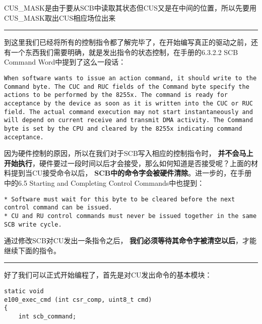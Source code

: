 \documentclass{article}
\newcommand{\highlight}[1]{{\bfseries \color{red}  #1}}
\begin{document}
\begin{CJK*}{UTF8}{gkai}
\begin{description}
CUS\_MASK是由于要从SCB中读取其状态但CUS又是在中间的位置，所以先要用CUS\_MASK取出CUS相应场位出来

\end{description}


\vspace{2em}
\hrule
\vspace{2em}

到这里我们已经将所有的控制指令都了解完毕了，在开始编写真正的驱动之前，还有一个东西我们需要明确，就是发出指令的状态控制，在手册的6.3.2.2 SCB Command Word中提到了这么一段话：

\begin{lstlisting}[style=challenge]
When software wants to issue an action command, it should write to the Command byte. The CUC and RUC fields of the Command byte specify the actions to be performed by the 8255x. The command is ready for acceptance by the device as soon as it is written into the CUC or RUC field. The actual command execution may not start instantaneously and will depend on current receive and transmit DMA activity. The Command byte is set by the CPU and cleared by the 8255x indicating command acceptance.
\end{lstlisting}

因为硬件控制的原因，所以在我们对于SCB写入相应的控制指令时，\highlight{并不会马上开始执行}，硬件要过一段时间以后才会接受，那么如何知道是否接受呢？上面的材料提到当CU接受命令以后，\highlight{SCB中的命令字会被硬件清除}。进一步的，在手册中的6.5 Starting and Completing Control Commands中也提到：

\begin{lstlisting}[style=challenge]
* Software must wait for this byte to be cleared before the next control command can be issued.
* CU and RU control commands must never be issued together in the same SCB write cycle.
\end{lstlisting}

通过修改SCB对CU发出一条指令之后，\highlight{我们必须等待其命令字被清空以后}，才能继续下面的指令。

\vspace{2em}
\hrule
\vspace{2em}

好了我们可以正式开始编程了，首先是对CU发出命令的基本模块：

\begin{lstlisting}[style=ccode, title={\scriptsize \ttfamily \bfseries kern/e100.c: e100\_exec\_cmd()}]
static void
e100_exec_cmd (int csr_comp, uint8_t cmd)
{
    int scb_command;


\end{lstlisting}
\end{CJK*}
\end{document}
